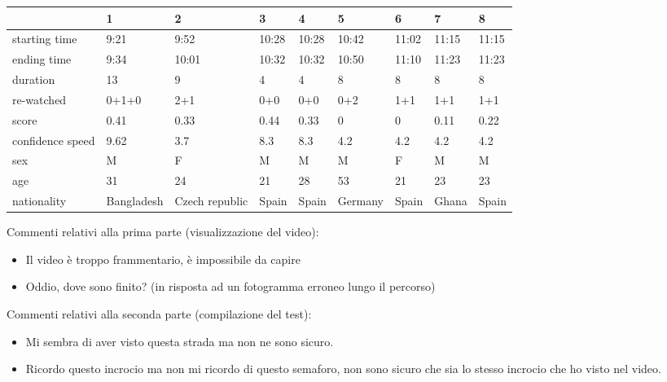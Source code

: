 \documentclass[12pt,a4paper,openright, notitlepage]{report}
\begin{document}
\begin{adjustwidth}{-1cm}{}
\small
\begin{center}
    \begin{tabular}{| l | l | p{2cm} | l | l | l | l | l | l |}
    \hline
	& 1 & 2 & 3 & 4 & 5 & 6 & 7 & 8 \\ \hline
	starting time & 9:21 & 9:52 & 10:28 & 10:28 & 10:42 & 11:02 & 11:15 & 11:15 \\ \hline
	ending time & 9:34 & 10:01 & 10:32 & 10:32 & 10:50 & 11:10 & 11:23 & 11:23 \\ \hline
	duration & 13 & 9 & 4 & 4 & 8 & 8 & 8 & 8 \\ \hline
	re-watched & 0+1+0 & 2+1 & 0+0 & 0+0 & 0+2 & 1+1 & 1+1 & 1+1 \\ \hline
	score & 0.41 & 0.33 & 0.44 & 0.33 & 0 & 0 & 0.11 & 0.22 \\ \hline
	confidence speed & 9.62 & 3.7 & 8.3 & 8.3 & 4.2 & 4.2 & 4.2 & 4.2 \\ \hline
	sex & M & F & M & M & M & F & M & M \\ \hline
	age & 31 & 24 & 21 & 28 & 53 & 21 & 23 & 23 \\ \hline
	nationality & Bangladesh & Czech republic & Spain & Spain & Germany & Spain & Ghana & Spain \\ \hline
    \end{tabular}
\end{center}
\normalsize
\end{adjustwidth}

Commenti relativi alla prima parte (visualizzazione del video):

\begin{itemize}
	\item Il video è troppo frammentario, è impossibile da capire
	\item Oddio, dove sono finito? (in risposta ad un fotogramma erroneo lungo il percorso)
\end{itemize}

Commenti relativi alla seconda parte (compilazione del test):

\begin{itemize}
	\item Mi sembra di aver visto questa strada ma non ne sono sicuro.
	\item Ricordo questo incrocio ma non mi ricordo di questo semaforo, non sono sicuro che sia lo stesso incrocio che ho visto nel video.
\end{itemize}
\end{document}
